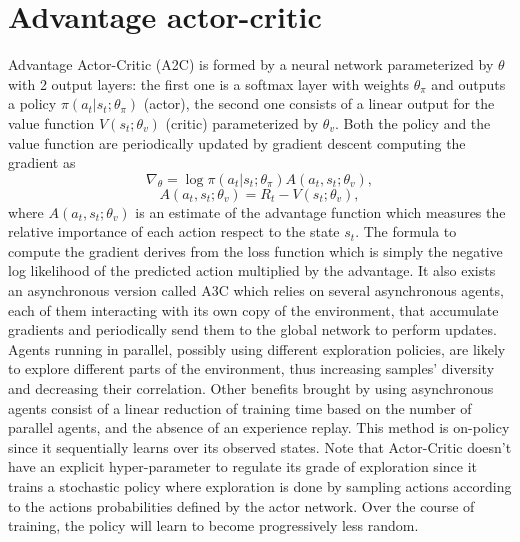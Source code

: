 \section{Advantage actor-critic}
Advantage Actor-Critic (A2C) \cite{mnih2016asynchronous} is formed by a neural network parameterized by \(\theta\) with 2 output layers: the first one is a softmax layer with weights \(\theta_\pi\) and outputs a policy \(\pi(a_t|s_t; \theta_\pi)\) (actor), the second one consists of a linear output for the value function \(V(s_t; \theta_v)\) (critic) parameterized by \(\theta_v\). Both the policy and the value function are periodically updated by gradient descent computing the gradient as
\begin{equation} \label{equation:A2C}
\nabla_\theta=\log \pi(a_t|s_t;\theta_\pi)A(a_t,s_t;\theta_v),
\end{equation}
\begin{equation} \label{equation:advantage}
A(a_t,s_t;\theta_v)=R_t-V(s_t;\theta_v),
\end{equation}
where \(A(a_t,s_t;\theta_v)\) is an estimate of the advantage function which measures the relative importance of each action respect to the state \(s_t\). The formula to compute the gradient derives from the loss function which is simply the negative log likelihood of the predicted action multiplied by the advantage. It also exists an asynchronous version called A3C which relies on several asynchronous agents, each of them interacting with its own copy of the environment, that accumulate gradients and periodically send them to the global network to perform updates. Agents running in parallel, possibly using different exploration policies, are likely to explore different parts of the environment, thus increasing samples' diversity and decreasing their correlation. Other benefits brought by using asynchronous agents consist of a linear reduction of training time based on the number of parallel agents, and the absence of an experience replay. This method is on-policy since it sequentially learns over its observed states. Note that Actor-Critic doesn't have an explicit hyper-parameter to regulate its grade of exploration since it trains a stochastic policy where exploration is done by sampling actions according to the actions probabilities defined by the actor network. Over the course of training, the policy will learn to become progressively less random.

